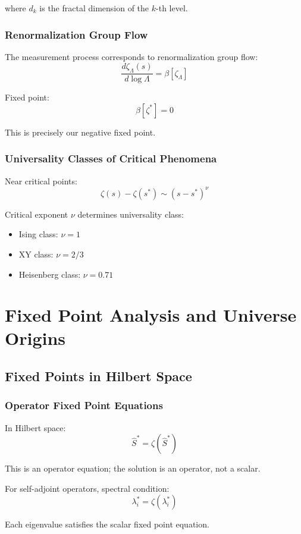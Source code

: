 \documentclass[11pt]{article}
\theoremstyle{plain}
\theoremstyle{definition}
\theoremstyle{remark}
\begin{document}
where $d_k$ is the fractal dimension of the $k$-th level.

\subsubsection{Renormalization Group Flow}

The measurement process corresponds to renormalization group flow:
$$\frac{d\zeta_{\Lambda}(s)}{d\log\Lambda} = \beta[\zeta_{\Lambda}]$$

Fixed point:
$$\beta[\zeta^*] = 0$$

This is precisely our negative fixed point.

\subsubsection{Universality Classes of Critical Phenomena}

Near critical points:
$$\zeta(s) - \zeta(s^*) \sim (s - s^*)^{\nu}$$

Critical exponent $\nu$ determines universality class:
\begin{itemize}
\item Ising class: $\nu = 1$
\item XY class: $\nu = 2/3$
\item Heisenberg class: $\nu = 0.71$
\end{itemize}

\section{Fixed Point Analysis and Universe Origins}

\subsection{Fixed Points in Hilbert Space}

\subsubsection{Operator Fixed Point Equations}

In Hilbert space:
$$\hat{S}^* = \zeta(\hat{S}^*)$$

This is an operator equation; the solution is an operator, not a scalar.

For self-adjoint operators, spectral condition:
$$\lambda_i^* = \zeta(\lambda_i^*)$$

Each eigenvalue satisfies the scalar fixed point equation.
\end{document}
